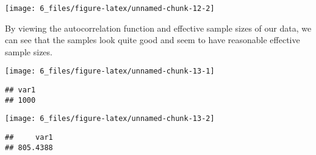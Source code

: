 \documentclass[]{article}
\newenvironment{Shaded}{\begin{snugshade}}{\end{snugshade}}
\newcommand{\DataTypeTok}[1]{\textcolor[rgb]{0.13,0.29,0.53}{#1}}
\newcommand{\KeywordTok}[1]{\textcolor[rgb]{0.13,0.29,0.53}{\textbf{#1}}}
\newcommand{\NormalTok}[1]{#1}
\newcommand{\OperatorTok}[1]{\textcolor[rgb]{0.81,0.36,0.00}{\textbf{#1}}}
\newcommand{\StringTok}[1]{\textcolor[rgb]{0.31,0.60,0.02}{#1}}
\begin{document}
\begin{center}\texttt{[image: 6\_files/figure-latex/unnamed-chunk-12-2]} \end{center}

By viewing the autocorrelation function and effective sample sizes of
our data, we can see that the samples look quite good and seem to have
reasonable effective sample sizes.

\begin{Shaded}
\end{Shaded}

\begin{center}\texttt{[image: 6\_files/figure-latex/unnamed-chunk-13-1]} \end{center}

\begin{Shaded}
\end{Shaded}

\begin{verbatim}
## var1 
## 1000
\end{verbatim}

\begin{Shaded}
\end{Shaded}

\begin{center}\texttt{[image: 6\_files/figure-latex/unnamed-chunk-13-2]} \end{center}

\begin{Shaded}
\end{Shaded}

\begin{verbatim}
##     var1 
## 805.4388
\end{verbatim}
\end{document}
